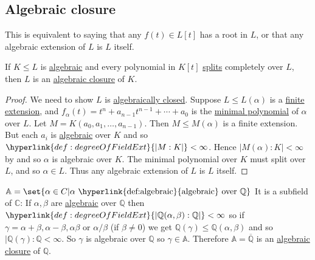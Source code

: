 \documentclass{article}
\begin{document}
\subsection{Algebraic closure}
\begin{remark}
    This is equivalent to saying that any $f(t) \in L[t]$ has a root in $L$, or that any algebraic extension of $L$ is $L$ itself.
\end{remark}
\begin{nlemma}\label{lem:5.3}
    If $K \leq L$ is \hyperlink{def:algebraic}{algebraic} and every polynomial in $K[t]$ \hyperlink{def:splitting}{splits} completely over $L$, then $L$ is an \hyperlink{def:closure}{algebraic closure} of $K$.
\end{nlemma}
\begin{proof}
    We need to show $L$ is \hyperlink{def:closed}{algebraically closed}.
    Suppose $L \leq L(\alpha)$ is a \hyperlink{def:degreeOfFieldExt}{finite extension}, and $f_\alpha(t) = t^n + a_{n-1} t^{n-1} + \dotsb + a_0$ is the \hyperlink{def:minimalPoly}{minimal polynomial} of $\alpha$ over $L$.
    Let $M = K(a_0, a_1, \dotsc, a_{n-1})$.
    Then $M \leq M(\alpha)$ is a finite extension.
    But each $a_i$ is \hyperlink{def:algebraic}{algebraic} over $K$ and so $\hyperlink{def:degreeOfFieldExt}{|M:K|}<\infty$.
    Hence $|M(\alpha):K| < \infty$ by  and so $\alpha$ is algebraic over $K$.
    The minimal polynomial over $K$ must split over $L$, and so $\alpha \in L$.
    Thus any algebraic extension of $L$ is $L$ itself.
\end{proof}
\begin{eg}
    $\mathbb{A} = \set{\alpha \in C | \alpha \text{ \hyperlink{def:algebraic}{algebraic} over } \mathbb{Q}}$
    It is a subfield of $\mathbb{C}$: If $\alpha,\beta$ are \hyperlink{def:algebraic}{algebraic} over $\mathbb{Q}$ then $\hyperlink{def:degreeOfFieldExt}{|\mathbb{Q}(\alpha,\beta):\mathbb{Q}|} < \infty$ so if $\gamma = \alpha+\beta,\alpha-\beta,\alpha\beta$ or $\alpha/\beta$ (if $\beta\neq0$) we get $\mathbb{Q}(\gamma) \leq \mathbb{Q}(\alpha,\beta)$ and so $|\mathbb{Q}(\gamma):\mathbb{Q}<\infty$.
    So $\gamma$ is algebraic over $\mathbb{Q}$ so $\gamma \in \mathbb{A}$. Therefore $\mathbb{A} = \overline{\mathbb{Q}}$ is an \hyperlink{def:closure}{algebraic closure} of $\mathbb{Q}$.
\end{eg}
\end{document}

